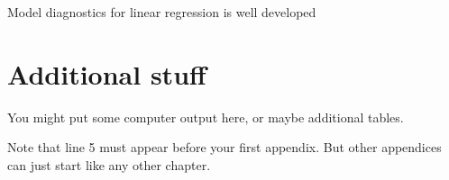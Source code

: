 \documentclass{monashthesis}
\theoremstyle{definition}
\theoremstyle{definition}
\theoremstyle{definition}
\theoremstyle{definition}
\theoremstyle{remark}
\begin{document}
Model diagnostics for linear regression is well developed

\appendix

\hypertarget{additional-stuff}{%
\chapter{Additional stuff}\label{additional-stuff}}

You might put some computer output here, or maybe additional tables.

Note that line 5 must appear before your first appendix. But other appendices can just start like any other chapter.

\printbibliography[heading=bibintoc]
\end{document}
